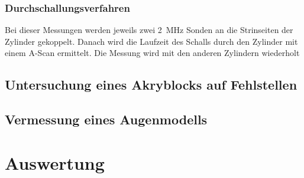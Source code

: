 \documentclass[11pt,ngerman,a4paper]{article}
\begin{document}
\subsubsection{Durchschallungsverfahren}
Bei dieser Messungen werden jeweils zwei \SI{2}{\mega\hertz} Sonden an die Strinseiten der Zylinder gekoppelt. Danach wird die Laufzeit des Schalls durch den Zylinder mit einem A-Scan ermittelt. Die Messung wird mit den anderen Zylindern wiederholt
\subsection{Untersuchung eines Akryblocks auf Fehlstellen}
\subsection{Vermessung eines  Augenmodells}
\section{Auswertung}
\end{document}
